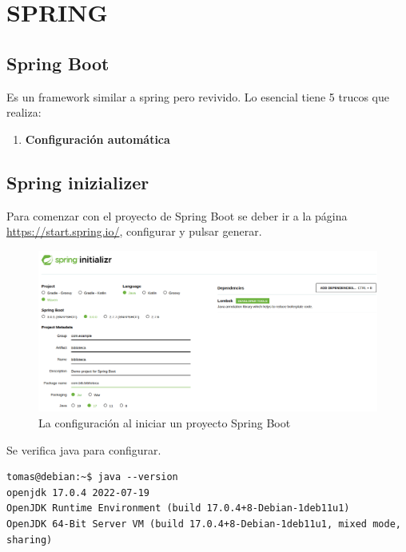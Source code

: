 \chapter*{SPRING}
\section{Spring Boot}
Es un framework similar a spring pero revivido. Lo esencial tiene 5 trucos que realiza:
\begin{enumerate}
\item \textbf{Configuración automática}
\end{enumerate}

\section{Spring inizializer}
Para comenzar con el proyecto de Spring Boot se deber ir a la página \url{https://start.spring.io/}, configurar y pulsar generar. 
\begin{figure}[h]
\includegraphics[scale=0.5]{images/spring1}
\caption{La configuración al iniciar un proyecto Spring Boot}
\end{figure}
Se verifica java para configurar. 
\begin{verbatim}
tomas@debian:~$ java --version
openjdk 17.0.4 2022-07-19
OpenJDK Runtime Environment (build 17.0.4+8-Debian-1deb11u1)
OpenJDK 64-Bit Server VM (build 17.0.4+8-Debian-1deb11u1, mixed mode, sharing)
\end{verbatim}


